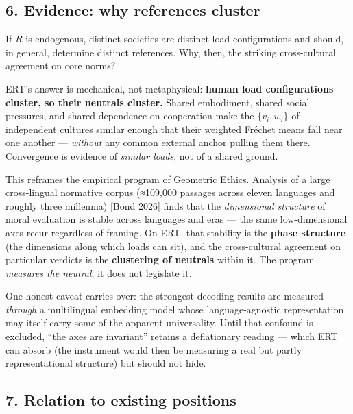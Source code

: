 \documentclass[
]{article}
\begin{document}
\subsection{6. Evidence: why references
cluster}\label{evidence-why-references-cluster}

If \(R\) is endogenous, distinct societies are distinct load
configurations and should, in general, determine distinct references.
Why, then, the striking cross-cultural agreement on core norms?

ERT's answer is mechanical, not metaphysical: \textbf{human load
configurations cluster, so their neutrals cluster.} Shared embodiment,
shared social pressures, and shared dependence on cooperation make the
\(\{v_i, w_i\}\) of independent cultures similar enough that their
weighted Fréchet means fall near one another --- \emph{without} any
common external anchor pulling them there. Convergence is evidence of
\emph{similar loads}, not of a shared ground.

This reframes the empirical program of Geometric Ethics. Analysis of a
large cross-lingual normative corpus (≈109,000 passages across eleven
languages and roughly three millennia) {[}Bond 2026{]} finds that the
\emph{dimensional structure} of moral evaluation is stable across
languages and eras --- the same low-dimensional axes recur regardless of
framing. On ERT, that stability is the \textbf{phase structure} (the
dimensions along which loads can sit), and the cross-cultural agreement
on particular verdicts is the \textbf{clustering of neutrals} within it.
The program \emph{measures the neutral}; it does not legislate it.

One honest caveat carries over: the strongest decoding results are
measured \emph{through} a multilingual embedding model whose
language-agnostic representation may itself carry some of the apparent
universality. Until that confound is excluded, ``the axes are
invariant'' retains a deflationary reading --- which ERT can absorb (the
instrument would then be measuring a real but partly representational
structure) but should not hide.

\subsection{7. Relation to existing
positions}\label{relation-to-existing-positions}
\end{document}
